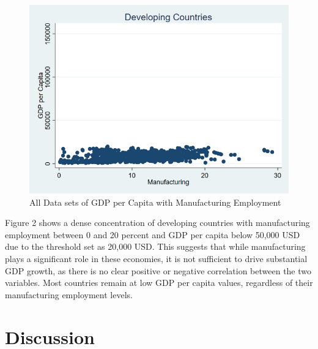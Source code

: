 \documentclass[12pt]{article}
\begin{document}
\begin{figure}
    \centering
    \includegraphics[width=0.5\linewidth]{Variable Graphs/New Scatterplot_Dvping.png}
    \caption{All Data sets of GDP per Capita with Manufacturing Employment}
    \label{figure 2}
\end{figure}
Figure 2 shows a dense concentration of developing countries with manufacturing employment between 0  and 20 percent and GDP per capita below 50,000 USD due to the threshold set as 20,000 USD. This suggests that while manufacturing plays a significant role in these economies, it is not sufficient to drive substantial GDP growth, as there is no clear positive or negative correlation between the two variables. Most countries remain at low GDP per capita values, regardless of their manufacturing employment levels.

\section{Discussion}
\label{sec:discussion}
\end{document}
